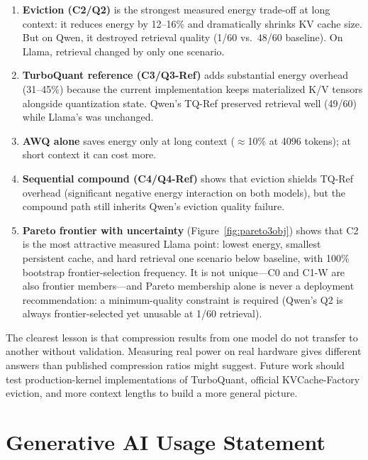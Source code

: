 \documentclass[sigconf,nonacm]{acmart}
\begin{document}
\begin{enumerate}
  \item \textbf{Eviction (C2/Q2)} is the strongest measured energy trade-off at
    long context: it reduces energy by 12--16\% and dramatically shrinks KV cache
    size. But on Qwen, it destroyed retrieval quality (1/60 vs.\ 48/60 baseline).
    On Llama, retrieval changed by only one scenario.

  \item \textbf{TurboQuant reference (C3/Q3-Ref)} adds substantial energy overhead
    (31--45\%) because the current implementation keeps materialized K/V tensors
    alongside quantization state. Qwen's TQ-Ref preserved retrieval well (49/60)
    while Llama's was unchanged.

  \item \textbf{AWQ alone} saves energy only at long context ($\approx$10\% at
    4096 tokens); at short context it can cost more.

  \item \textbf{Sequential compound (C4/Q4-Ref)} shows that eviction shields
    TQ-Ref overhead (significant negative energy interaction on both models), but
    the compound path still inherits Qwen's eviction quality failure.

  \item \textbf{Pareto frontier with uncertainty} (Figure~\ref{fig:pareto3obj})
    shows that C2 is the most attractive measured Llama point: lowest energy,
    smallest persistent cache, and hard retrieval one scenario below baseline,
    with 100\% bootstrap frontier-selection frequency. It is not unique---C0 and
    C1-W are also frontier members---and Pareto membership alone is never a
    deployment recommendation: a minimum-quality constraint is required (Qwen's
    Q2 is always frontier-selected yet unusable at 1/60 retrieval).
\end{enumerate}

The clearest lesson is that compression results from one model do not transfer to
another without validation. Measuring real power on real hardware gives different
answers than published compression ratios might suggest. Future work should test
production-kernel implementations of TurboQuant, official KVCache-Factory eviction,
and more context lengths to build a more general picture.


\section*{Generative AI Usage Statement}
\end{document}
